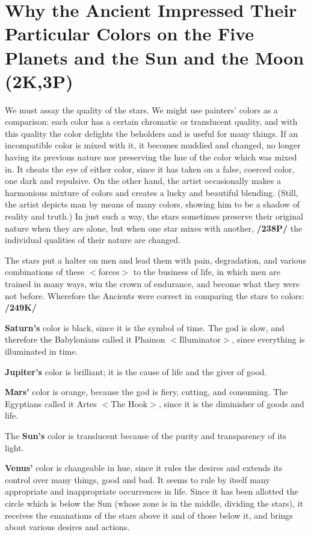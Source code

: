 \section{Why the Ancient Impressed Their Particular Colors on the Five Planets and the Sun and the Moon (2K,3P)}

We must assay the quality of the stars. We might use painters’ colors as a comparison: each color has a certain chromatic or translucent quality, and with this quality the color delights the beholders and is
useful for many things. If an incompatible color is mixed with it, it becomes muddied and changed, no longer having its previous nature nor preserving the hue of the color which was mixed in. It cheats the eye of either color, since it has taken on a false, coerced color, one dark and repulsive. On the other hand, the artist occasionally makes a harmonious mixture of colors and creates a lucky and beautiful blending. (Still, the artist depicts man by means of many colors, showing him to be a shadow of reality and truth.) In just such a way, the stars sometimes preserve their original nature when they are alone, but when one star mixes with another, \textbf{/238P/} the individual qualities of their nature are changed. 

The stars put a halter on men and lead them with pain, degradation, and various combinations of these $<$forces$>$ to the business of life, in which men are trained in many ways, win the crown of endurance, and become what they were not before. Wherefore the Ancients were correct in comparing the stars to colors: \textbf{/249K/}

\textbf{Saturn’s} color is black, since it is the symbol of time. The god is slow, and therefore the Babylonians called it Phainon $<$Illuminator$>$, since everything is illuminated in time.

\textbf{Jupiter’s} color is brilliant; it is the cause of life and the giver of good.

\textbf{Mars’} color is orange, because the god is fiery, cutting, and consuming. The Egyptians called it Artes $<$The Hook$>$, since it is the diminisher of goods and life.

The \textbf{Sun’s} color is translucent because of the purity and transparency of its light.

\textbf{Venus’} color is changeable in hue, since it rules the desires and extends its control over many things, good and bad. It seems to rule by itself many appropriate and inappropriate occurrences in life. Since it has been allotted the circle which is below the Sun (whose zone is in the middle, dividing the stars), it receives the emanations of the stars above it and of those below it, and brings about various desires and actions.

